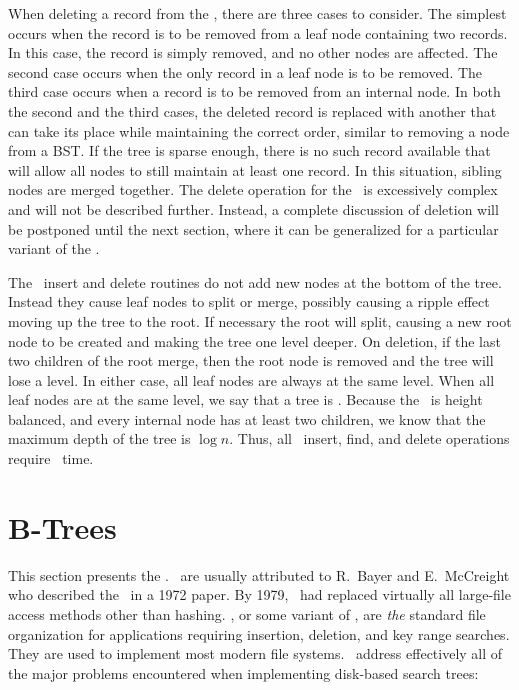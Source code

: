 When deleting a record from the \TTtree, there are three cases to
consider.
The simplest occurs when the record is to be removed from a leaf node
containing two records.
In this case, the record is simply removed, and no other nodes are
affected.
The second case occurs when the only record in a leaf node is to be
removed.
The third case occurs when a record is to be removed from an internal
node.
In both the second and the third cases, the deleted record is replaced
with another that can take its place while maintaining the correct
order, similar to removing a node from a BST.
If the tree is sparse enough, there is no such record available that
will allow all nodes to still maintain at least one record.
In this situation, sibling nodes are merged together.
The delete operation for the \TTtree\ is excessively complex and
will not be described further.
Instead, a complete discussion of deletion will be postponed until the
next section, where it can be generalized for a particular variant of
the \Btree.

The \TTtree\ insert and delete routines do not add new nodes at the
bottom of the tree.
Instead they cause leaf nodes to split or merge, possibly causing a
ripple effect moving up the tree to the root.
If necessary the root will split, causing a new root node to be
created and making the tree one level deeper.
On deletion, if the last two children of the root merge,
then the root node is removed and the tree will lose a level.
In either case, all leaf nodes are always at the same level.
When all leaf nodes are at the same level, we say that a tree is
.
Because the \TTtree\ is height balanced, and every internal node has
at least two children, we know that the maximum depth of the tree
is \(\log n\).
Thus, all \TTtree\ insert, find, and delete operations require
\Thetalogn\ time.


\section{B-Trees}
\label{BTree}

This section presents the \Btree.
\Btrees\ are usually attributed to R.~Bayer and E.~McCreight
who described the \Btree\ in a 1972 paper.
By 1979, \Btrees\ had replaced virtually all large-file access
methods other than hashing.
\Btrees, or some variant of \Btrees, are \emph{the} standard file
organization for applications requiring insertion, deletion, and key
range searches.
They are used to implement most modern file systems.
\Btrees\ address effectively all of the major problems encountered
when implementing disk-based search trees:

